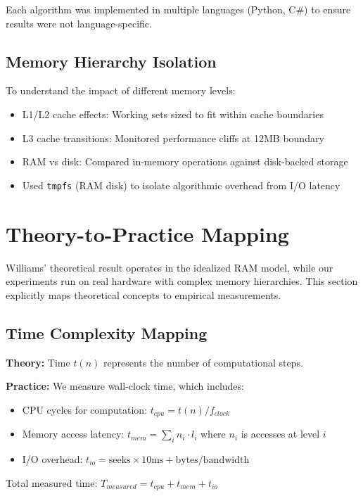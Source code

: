 \documentclass[11pt]{article}
\theoremstyle{definition}
\begin{document}
Each algorithm was implemented in multiple languages (Python, C\#) to ensure results were not language-specific.

\subsection{Memory Hierarchy Isolation}

To understand the impact of different memory levels:
\begin{itemize}
\item L1/L2 cache effects: Working sets sized to fit within cache boundaries
\item L3 cache transitions: Monitored performance cliffs at 12MB boundary
\item RAM vs disk: Compared in-memory operations against disk-backed storage
\item Used \texttt{tmpfs} (RAM disk) to isolate algorithmic overhead from I/O latency
\end{itemize}

\section{Theory-to-Practice Mapping}
\label{sec:theory-practice}

Williams' theoretical result operates in the idealized RAM model, while our experiments run on real hardware with complex memory hierarchies. This section explicitly maps theoretical concepts to empirical measurements.

\subsection{Time Complexity Mapping}

\textbf{Theory:} Time $t(n)$ represents the number of computational steps.

\textbf{Practice:} We measure wall-clock time, which includes:
\begin{itemize}
\item CPU cycles for computation: $t_{cpu} = t(n) / f_{clock}$
\item Memory access latency: $t_{mem} = \sum_{i} n_i \cdot l_i$ where $n_i$ is accesses at level $i$
\item I/O overhead: $t_{io} = \text{seeks} \times 10\text{ms} + \text{bytes} / \text{bandwidth}$
\end{itemize}

Total measured time: $T_{measured} = t_{cpu} + t_{mem} + t_{io}$
\end{document}
